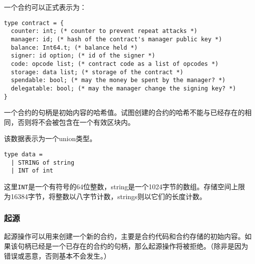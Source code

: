 \documentclass[letterpaper]{article}
\begin{document}
一个合约可以正式表示为：

\begin{lstlisting}
type contract = {
  counter: int; (* counter to prevent repeat attacks *)
  manager: id; (* hash of the contract's manager public key *)
  balance: Int64.t; (* balance held *)
  signer: id option; (* id of the signer *)
  code: opcode list; (* contract code as a list of opcodes *)
  storage: data list; (* storage of the contract *)
  spendable: bool; (* may the money be spent by the manager? *)
  delegatable: bool; (* may the manager change the signing key? *)
}
\end{lstlisting}

一个合约的句柄是初始内容的哈希值。试图创建的合约的哈希不能与已经存在的相同，否则将不会被包含在一个有效区块内。

该数据表示为一个union类型。

\begin{lstlisting}
type data =
  | STRING of string
  | INT of int
\end{lstlisting}

这里\verb!INT!是一个有符号的64位整数，string是一个1024字节的数组。存储空间上限为\num{16384}字节，将整数以八字节计数，strings则以它们的长度计数。

\subsubsection{起源}

起源操作可以用来创建一个新的合约，主要是合约代码和合约存储的初始内容。如果该句柄已经是一个已存在的合约的句柄，那么起源操作将被拒绝。（除非是因为错误或恶意，否则基本不会发生。）
\end{document}
